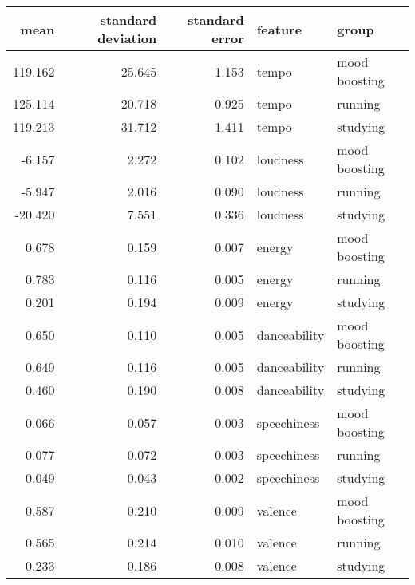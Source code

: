\begin{tabular}{rrrll}
\toprule
   mean &  standard deviation &  standard error &      feature &         group \\
\midrule
119.162 &              25.645 &           1.153 &        tempo & mood boosting \\
125.114 &              20.718 &           0.925 &        tempo &       running \\
119.213 &              31.712 &           1.411 &        tempo &      studying \\
 -6.157 &               2.272 &           0.102 &     loudness & mood boosting \\
 -5.947 &               2.016 &           0.090 &     loudness &       running \\
-20.420 &               7.551 &           0.336 &     loudness &      studying \\
  0.678 &               0.159 &           0.007 &       energy & mood boosting \\
  0.783 &               0.116 &           0.005 &       energy &       running \\
  0.201 &               0.194 &           0.009 &       energy &      studying \\
  0.650 &               0.110 &           0.005 & danceability & mood boosting \\
  0.649 &               0.116 &           0.005 & danceability &       running \\
  0.460 &               0.190 &           0.008 & danceability &      studying \\
  0.066 &               0.057 &           0.003 &  speechiness & mood boosting \\
  0.077 &               0.072 &           0.003 &  speechiness &       running \\
  0.049 &               0.043 &           0.002 &  speechiness &      studying \\
  0.587 &               0.210 &           0.009 &      valence & mood boosting \\
  0.565 &               0.214 &           0.010 &      valence &       running \\
  0.233 &               0.186 &           0.008 &      valence &      studying \\
\bottomrule
\end{tabular}
